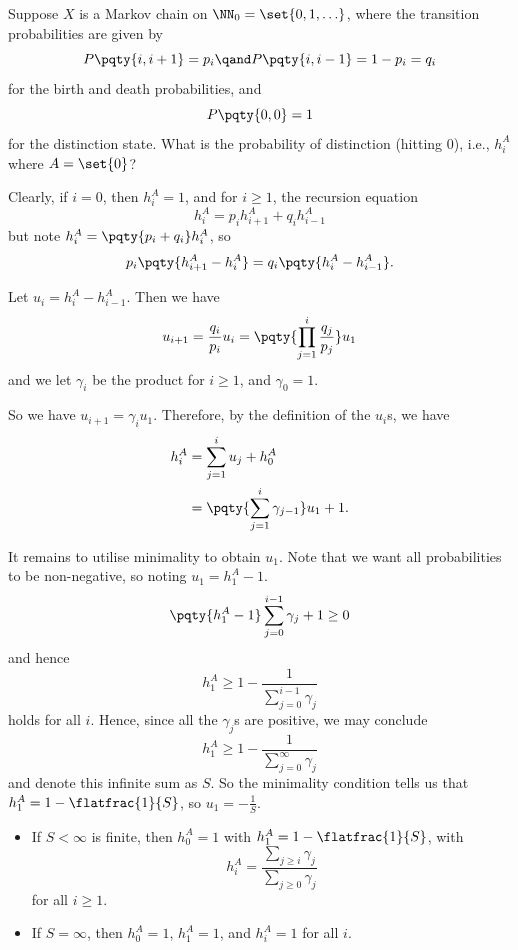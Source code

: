 \begin{example}
    Suppose \(X\) is a Markov chain on \(\NN_0 = \set{0, 1, \ldots}\), where the transition probabilities are given by
    \[
        P\pqty{i, i + 1} = p_i \qand P\pqty{i, i - 1} = 1 - p_i = q_i
    \]
    for the birth and death probabilities, and
    \[
        P\pqty{0, 0} = 1
    \]
    for the distinction state. What is the probability of distinction (hitting \(0\)), i.e., \(h_i^A\) where \(A = \set{0}\)?

    Clearly, if \(i = 0\), then \(h_i^A = 1\), and for \(i \geq 1\), the recursion equation
    \[
        h_i^A = p_i h_{i + 1}^A + q_i h_{i - 1}^A
    \]
    but note \(h_i^A = \pqty{p_i + q_i} h_i^A\), so
    \[
        p_i \pqty{h_{i + 1}^A - h_i^A} = q_i \pqty{h_i^A - h_{i - 1}^A}.
    \]

    Let \(u_i = h_i^A - h_{i - 1}^A\). Then we have
    \[
        u_{i + 1} = \frac{q_i}{p_i} u_i = \pqty{\prod_{j = 1}^{i} \frac{q_j}{p_j}} u_1
    \]
    and we let \(\gamma_i\) be the product for \(i \geq 1\), and \(\gamma_0 = 1\).

    So we have \(u_{i + 1} = \gamma_i u_1\). Therefore, by the definition of the \(u_i\)s, we have
    \begin{align*}
        h_i^A &= \sum_{j = 1}^{i} u_j + h_0^A \\
        &= \pqty{\sum_{j = 1}^{i} \gamma_{j - 1}} u_1 + 1.
    \end{align*}

    It remains to utilise minimality to obtain \(u_1\). Note that we want all probabilities to be non-negative, so noting \(u_1 = h_1^A - 1\).
    \[
        \pqty{h_1^A - 1} \sum_{j = 0}^{i - 1} \gamma_j + 1 \geq 0
    \]
    and hence
    \[
        h_1^A \geq 1 - \frac{1}{\sum_{j = 0}^{i - 1} \gamma_j}
    \]
    holds for all \(i\). Hence, since all the \(\gamma_j\)s are positive, we may conclude
    \[
        h_1^A \geq 1 - \frac{1}{\sum_{j = 0}^{\infty} \gamma_j}
    \]
    and denote this infinite sum as \(S\). So the minimality condition tells us that \(h_1^A = 1 - \flatfrac{1}{S}\), so \(u_1 = - \frac{1}{S}\).

    \begin{itemize}
        \item If \(S < \infty\) is finite, then \(h_0^A = 1\) with \(h_1^A = 1 - \flatfrac{1}{S}\), with
        \[
            h_i^A = \frac{\sum_{j \geq i} \gamma_j}{\sum_{j \geq 0} \gamma_j}
        \]
        for all \(i \geq 1\).
        \item If \(S = \infty\), then \(h_0^A = 1\), \(h_1^A = 1\), and \(h_i^A = 1\) for all \(i\).
    \end{itemize}
\end{example}

